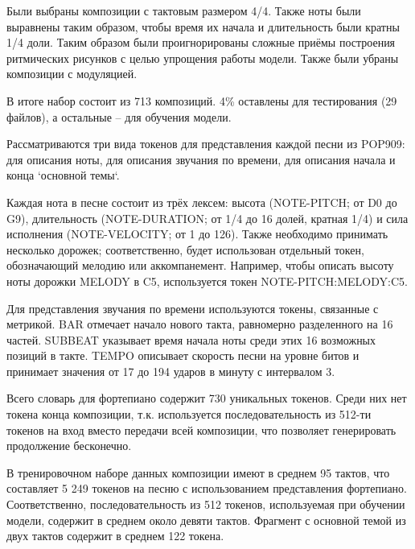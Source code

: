     Были выбраны композиции с тактовым размером 4/4. Также ноты были выравнены таким образом, чтобы время их начала и длительность были кратны 1/4 доли. Таким образом были проигнорированы сложные приёмы построения ритмических рисунков с целью упрощения работы модели. Также были убраны композиции с модуляцией.
    
    В итоге набор состоит из 713 композиций. 4\% оставлены для тестирования (29 файлов), а остальные -- для обучения модели. 

    Рассматриваются три вида токенов для представления каждой песни из POP909: для описания ноты, для описания звучания по времени, для описания начала и конца `основной темы`.
    
    Каждая нота в песне состоит из трёх лексем: высота (NOTE-PITCH; от D0 до G9), длительность (NOTE-DURATION; от 1/4 до 16 долей, кратная 1/4) и сила исполнения (NOTE-VELOCITY; от 1 до 126). Также необходимо принимать несколько дорожек; соответственно, будет использован отдельный токен, обозначающий мелодию или аккомпанемент. Например, чтобы описать высоту ноты дорожки MELODY в C5, используется токен NOTE-PITCH:MELODY:C5. 
    
    Для представления звучания по времени используются токены, связанные с метрикой. BAR отмечает начало нового такта, равномерно разделенного на 16 частей. SUBBEAT указывает время начала ноты среди этих 16 возможных позиций в такте. TEMPO описывает скорость песни на уровне битов и принимает значения от 17 до 194 ударов в минуту с интервалом 3. 
    
    Всего словарь для фортепиано содержит 730 уникальных токенов. Среди них нет токена конца композиции, т.к. используется последовательность из 512-ти токенов на вход вместо передачи всей композиции, что позволяет генерировать продолжение бесконечно.
    
    В тренировочном наборе данных композиции имеют в среднем 95 тактов, что составляет 5 249 токенов на песню с использованием представления фортепиано. Соответственно, последовательность из 512 токенов, используемая при обучении модели, содержит в среднем около девяти тактов. Фрагмент с основной темой из двух тактов содержит в среднем 122 токена.
    

